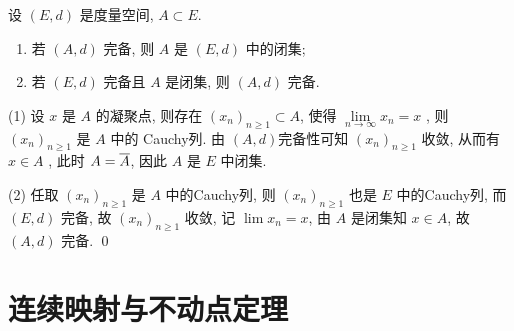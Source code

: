 \begin{Thm}
     设 $ (E, d) $ 是度量空间, $ A\subset E $. 
     \begin{enumerate}[(1)]
          \item 若 $ (A, d) $ 完备, 则 $ A $ 是 $ (E, d) $ 中的闭集;
          \item 若 $ (E, d) $ 完备且 $ A $ 是闭集, 则 $ (A, d) $ 完备. 
     \end{enumerate} 
\end{Thm}
\begin{Prf}
     (1) 设 $ x $ 是 $ A $ 的凝聚点, 则存在 $ (x_{n})_{n\geqslant1}\subset A $, 使得 $ \lim\limits_{n\to\infty}x_{n}=x $ , 则 $ (x_{n})_{n\geqslant1} $ 是 $ A $ 中的 Cauchy列. 由 $ (A, d) $完备性可知 $ (x_{n})_{n\geqslant1} $ 收敛, 从而有 $ x\in A $ , 此时 $ A=\baro{A} $, 因此 $ A $ 是 $ E $ 中闭集. 

     (2) 任取 $ (x_{n})_{n\geqslant1} $ 是 $ A $ 中的Cauchy列, 则 $ (x_{n})_{n\geqslant1} $ 也是 $ E $ 中的Cauchy列, 而 $ (E, d) $ 完备, 故 $ (x_{n})_{n\geqslant1} $ 收敛, 记 $ \lim\limits x_{n}=x $, 由 $ A $ 是闭集知 $ x\in A $, 故 $ (A, d) $ 完备. \qed
\end{Prf}
\section{连续映射与不动点定理}